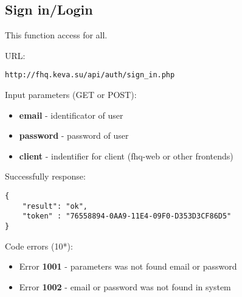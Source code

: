 \subsection{Sign in/Login}
\par

This function access for all.

URL:
\begin{Verbatim}[frame=single]
http://fhq.keva.su/api/auth/sign_in.php
\end{Verbatim}

Input parameters (GET or POST):
\begin{itemize}
  \item \textbf{email} - identificator of user
  \item \textbf{password} - password of user
  \item \textbf{client} - indentifier for client (fhq-web or other frontends)
\end{itemize}

Successfully response:  \\
\begin{Verbatim}[frame=single]
{
    "result": "ok",
    "token" : "76558894-0AA9-11E4-09F0-D353D3CF86D5"
}
\end{Verbatim}

Code errors (10*):
\begin{itemize}
  \item {\color{red} Error \textbf{1001} - parameters was not found email or password}
  \item {\color{red} Error \textbf{1002} - email or password was not found in system}
\end{itemize}
